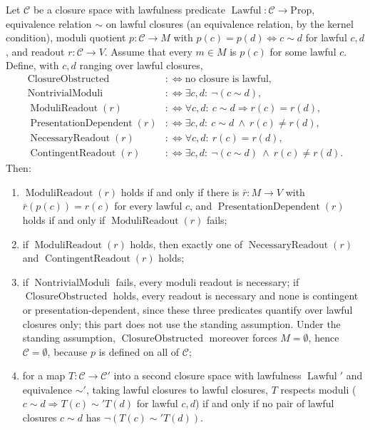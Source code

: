 \begin{theorem}\label{thm:F26}
Let \(\mathcal C\) be a closure space with lawfulness predicate
\(\operatorname{Lawful}:\mathcal C\to\mathrm{Prop}\), equivalence relation
\(\sim\) on lawful closures (an equivalence relation, by the kernel condition), moduli quotient \(p:\mathcal C\to M\) with
\(p(c)=p(d)\iff c\sim d\) for lawful \(c,d\), and readout
\(r:\mathcal C\to V\). Assume that every \(m\in M\) is \(p(c)\) for some
lawful \(c\). Define, with \(c,d\) ranging over lawful closures,
\begin{align*}
  \operatorname{ClosureObstructed}
  &:\Longleftrightarrow
  \text{no closure is lawful},\\
  \operatorname{NontrivialModuli}
  &:\Longleftrightarrow
  \exists c,d:\ \neg(c\sim d),\\
  \operatorname{ModuliReadout}(r)
  &:\Longleftrightarrow
  \forall c,d:\ c\sim d\Rightarrow r(c)=r(d),\\
  \operatorname{PresentationDependent}(r)
  &:\Longleftrightarrow
  \exists c,d:\ c\sim d\ \wedge\ r(c)\ne r(d),\\
  \operatorname{NecessaryReadout}(r)
  &:\Longleftrightarrow
  \forall c,d:\ r(c)=r(d),\\
  \operatorname{ContingentReadout}(r)
  &:\Longleftrightarrow
  \exists c,d:\ \neg(c\sim d)\ \wedge\ r(c)\ne r(d).
\end{align*}
Then:
\begin{enumerate}[label=(\roman*)]
\item \(\operatorname{ModuliReadout}(r)\) holds if and only if there is
  \(\bar r:M\to V\) with \(\bar r(p(c))=r(c)\) for every lawful \(c\), and
  \(\operatorname{PresentationDependent}(r)\) holds if and only if
  \(\operatorname{ModuliReadout}(r)\) fails;
\item if \(\operatorname{ModuliReadout}(r)\) holds, then exactly one of
  \(\operatorname{NecessaryReadout}(r)\) and
  \(\operatorname{ContingentReadout}(r)\) holds;
\item if \(\operatorname{NontrivialModuli}\) fails, every moduli readout is
  necessary; if \(\operatorname{ClosureObstructed}\) holds, every readout is
  necessary and none is contingent or presentation-dependent, since these
  three predicates quantify over lawful closures only; this part does not use
  the standing assumption. Under the standing assumption,
  \(\operatorname{ClosureObstructed}\) moreover forces \(M=\emptyset\), hence
  \(\mathcal C=\emptyset\), because \(p\) is defined on all of \(\mathcal C\);
\item for a map \(T:\mathcal C\to\mathcal C'\) into a second closure space
  with lawfulness \(\operatorname{Lawful}'\) and equivalence \(\sim'\), taking
  lawful closures to lawful closures, \(T\) respects moduli
  (\(c\sim d\Rightarrow T(c)\sim' T(d)\) for lawful \(c,d\)) if and only if no
  pair of lawful closures \(c\sim d\) has \(\neg(T(c)\sim' T(d))\).
\end{enumerate}
\end{theorem}
